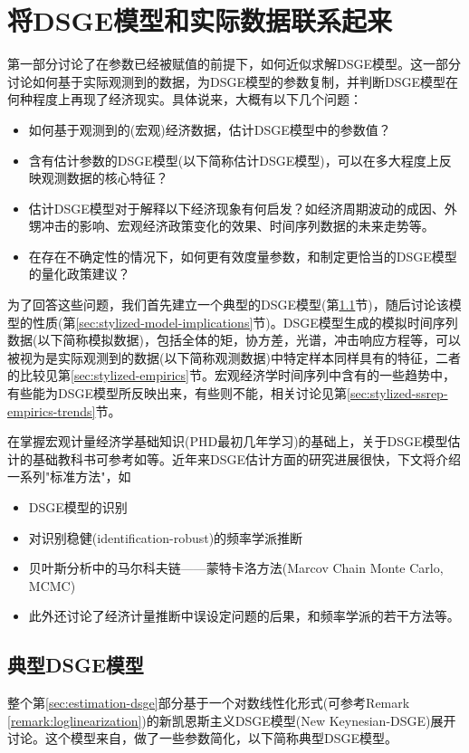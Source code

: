 \chapter{将DSGE模型和实际数据联系起来}
\label{sec:connection}

第一部分讨论了在参数已经被赋值的前提下，如何近似求解DSGE模型。这一部分讨论如何基于实际观测到的数据，为DSGE模型的参数复制，并判断DSGE模型在何种程度上再现了经济现实。具体说来，大概有以下几个问题：
\begin{itemize}
  \item 如何基于观测到的(宏观)经济数据，估计DSGE模型中的参数值？
  \item 含有估计参数的DSGE模型(以下简称估计DSGE模型)，可以在多大程度上反映观测数据的核心特征？
  \item 估计DSGE模型对于解释以下经济现象有何启发？如经济周期波动的成因、外甥冲击的影响、宏观经济政策变化的效果、时间序列数据的未来走势等。
  \item 在存在不确定性的情况下，如何更有效度量参数，和制定更恰当的DSGE模型的量化政策建议？
\end{itemize}

为了回答这些问题，我们首先建立一个典型的DSGE模型(第\ref{sec:stylized-dsge-model}节)，随后讨论该模型的性质(第\ref{sec:stylized-model-implications}节)。DSGE模型生成的模拟时间序列数据(以下简称模拟数据)，包括全体的矩，协方差，光谱，冲击响应方程等，可以被视为是实际观测到的数据(以下简称观测数据)中特定样本同样具有的特征，二者的比较见第\ref{sec:stylized-empirics}节。宏观经济学时间序列中含有的一些趋势中，有些能为DSGE模型所反映出来，有些则不能，相关讨论见第\ref{sec:stylized-ssrep-empirics-trends}节。

在掌握宏观计量经济学基础知识(PHD最初几年学习)的基础上，关于DSGE模型估计的基础教科书可参考如\cite{Canova:2011vi, DeJong:2007ws}等。近年来DSGE估计方面的研究进展很快，下文将介绍一系列"标准方法"，如
\begin{itemize}
  \item DSGE模型的识别
  \item 对识别稳健(identification-robust)的频率学派推断
  \item 贝叶斯分析中的马尔科夫链——蒙特卡洛方法(Marcov Chain Monte Carlo, MCMC)\citep{Herbst:2015wh}
  \item 此外还讨论了经济计量推断中误设定问题的后果，和频率学派的若干方法等。
\end{itemize}

\section{典型DSGE模型}
\label{sec:stylized-dsge-model}
整个第\ref{sec:estimation-dsge}部分基于一个对数线性化形式(可参考Remark \ref{remark:loglinearization})的新凯恩斯主义DSGE模型(New Keynesian-DSGE)展开讨论。这个模型来自\cite{DelNegro:2008de}，做了一些参数简化\citep{Smets:2003ic, Christiano:2005ib}，以下简称典型DSGE模型。

